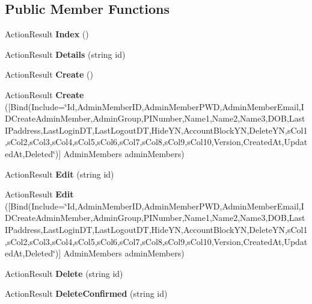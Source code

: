 \subsection*{Public Member Functions}
\begin{DoxyCompactItemize}
\item 
Action\+Result {\bfseries Index} ()\hypertarget{a00005_ac47911c93488d797a612f8e6354b7795}{}\label{a00005_ac47911c93488d797a612f8e6354b7795}

\item 
Action\+Result {\bfseries Details} (string id)\hypertarget{a00005_abe523da28ab355ae9e0b41f220c270a4}{}\label{a00005_abe523da28ab355ae9e0b41f220c270a4}

\item 
Action\+Result {\bfseries Create} ()\hypertarget{a00005_ab820ac379056eb4f74b996f38ecc9456}{}\label{a00005_ab820ac379056eb4f74b996f38ecc9456}

\item 
Action\+Result {\bfseries Create} (\mbox{[}Bind(Include=\char`\"{}Id,Admin\+Member\+ID,Admin\+Member\+P\+WD,Admin\+Member\+Email,I\+D\+Create\+Admin\+Member,Admin\+Group,P\+I\+Number,Name1,Name2,Name3,D\+OB,Last\+I\+Paddress,Last\+Login\+DT,Last\+Logout\+DT,Hide\+YN,Account\+Block\+YN,Delete\+YN,s\+Col1,s\+Col2,s\+Col3,s\+Col4,s\+Col5,s\+Col6,s\+Col7,s\+Col8,s\+Col9,s\+Col10,Version,Created\+At,Updated\+At,Deleted\char`\"{})\mbox{]} Admin\+Members admin\+Members)\hypertarget{a00005_acd378b5e573b228154a3e5b8e23ccb23}{}\label{a00005_acd378b5e573b228154a3e5b8e23ccb23}

\item 
Action\+Result {\bfseries Edit} (string id)\hypertarget{a00005_ad7255f40bbb352721d65c6075b060f08}{}\label{a00005_ad7255f40bbb352721d65c6075b060f08}

\item 
Action\+Result {\bfseries Edit} (\mbox{[}Bind(Include=\char`\"{}Id,Admin\+Member\+ID,Admin\+Member\+P\+WD,Admin\+Member\+Email,I\+D\+Create\+Admin\+Member,Admin\+Group,P\+I\+Number,Name1,Name2,Name3,D\+OB,Last\+I\+Paddress,Last\+Login\+DT,Last\+Logout\+DT,Hide\+YN,Account\+Block\+YN,Delete\+YN,s\+Col1,s\+Col2,s\+Col3,s\+Col4,s\+Col5,s\+Col6,s\+Col7,s\+Col8,s\+Col9,s\+Col10,Version,Created\+At,Updated\+At,Deleted\char`\"{})\mbox{]} Admin\+Members admin\+Members)\hypertarget{a00005_aba8ccd6915459bfd3533764566e61f0f}{}\label{a00005_aba8ccd6915459bfd3533764566e61f0f}

\item 
Action\+Result {\bfseries Delete} (string id)\hypertarget{a00005_a9a376a0f324a7da9293373097d45203c}{}\label{a00005_a9a376a0f324a7da9293373097d45203c}

\item 
Action\+Result {\bfseries Delete\+Confirmed} (string id)\hypertarget{a00005_a1396c1936892548cb565f97bf0b159e4}{}\label{a00005_a1396c1936892548cb565f97bf0b159e4}

\end{DoxyCompactItemize}

